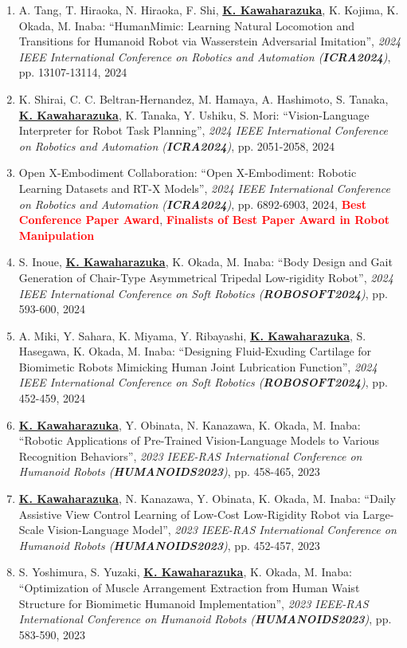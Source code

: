 \documentclass[letterpaper]{article}
\begin{document}
\begin{enumerate}
\item A. Tang, T. Hiraoka, N. Hiraoka, F. Shi, \underline{\textbf{K. Kawaharazuka}}, K. Kojima, K. Okada, M. Inaba: ``HumanMimic: Learning Natural Locomotion and Transitions for Humanoid Robot via Wasserstein Adversarial Imitation'', \textit{2024 IEEE International Conference on Robotics and Automation (\textit{\textbf{ICRA2024}})}, pp. 13107-13114, 2024
\item K. Shirai, C. C. Beltran-Hernandez, M. Hamaya, A. Hashimoto, S. Tanaka, \underline{\textbf{K. Kawaharazuka}}, K. Tanaka, Y. Ushiku, S. Mori: ``Vision-Language Interpreter for Robot Task Planning'', \textit{2024 IEEE International Conference on Robotics and Automation (\textit{\textbf{ICRA2024}})}, pp. 2051-2058, 2024
\item Open X-Embodiment Collaboration: ``Open X-Embodiment: Robotic Learning Datasets and RT-X Models'', \textit{2024 IEEE International Conference on Robotics and Automation (\textit{\textbf{ICRA2024}})}, pp. 6892-6903, 2024, \textbf{\textcolor{red}{Best Conference Paper Award}}, \textbf{\textcolor{red}{Finalists of Best Paper Award in Robot Manipulation}}
\item S. Inoue, \underline{\textbf{K. Kawaharazuka}}, K. Okada, M. Inaba: ``Body Design and Gait Generation of Chair-Type Asymmetrical Tripedal Low-rigidity Robot'', \textit{2024 IEEE International Conference on Soft Robotics (\textit{\textbf{ROBOSOFT2024}})}, pp. 593-600, 2024
\item A. Miki, Y. Sahara, K. Miyama, Y. Ribayashi, \underline{\textbf{K. Kawaharazuka}}, S. Hasegawa, K. Okada, M. Inaba: ``Designing Fluid-Exuding Cartilage for Biomimetic Robots Mimicking Human Joint Lubrication Function'', \textit{2024 IEEE International Conference on Soft Robotics (\textit{\textbf{ROBOSOFT2024}})}, pp. 452-459, 2024
\item \underline{\textbf{K. Kawaharazuka}}, Y. Obinata, N. Kanazawa, K. Okada, M. Inaba: ``Robotic Applications of Pre-Trained Vision-Language Models to Various Recognition Behaviors'', \textit{2023 IEEE-RAS International Conference on Humanoid Robots (\textit{\textbf{HUMANOIDS2023}})}, pp. 458-465, 2023
\item \underline{\textbf{K. Kawaharazuka}}, N. Kanazawa, Y. Obinata, K. Okada, M. Inaba: ``Daily Assistive View Control Learning of Low-Cost Low-Rigidity Robot via Large-Scale Vision-Language Model'', \textit{2023 IEEE-RAS International Conference on Humanoid Robots (\textit{\textbf{HUMANOIDS2023}})}, pp. 452-457, 2023
\item S. Yoshimura, S. Yuzaki, \underline{\textbf{K. Kawaharazuka}}, K. Okada, M. Inaba: ``Optimization of Muscle Arrangement Extraction from Human Waist Structure for Biomimetic Humanoid Implementation'', \textit{2023 IEEE-RAS International Conference on Humanoid Robots (\textit{\textbf{HUMANOIDS2023}})}, pp. 583-590, 2023

\end{enumerate}
\end{document}
